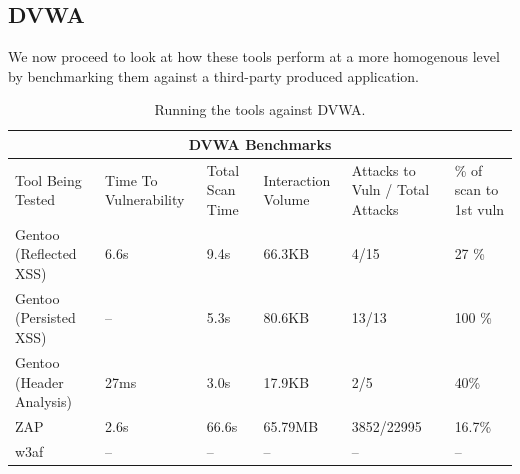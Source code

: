 \subsection{DVWA}

We now proceed to look at how these tools perform at a more homogenous level by benchmarking them against a third-party produced application. \\
\begin{table}[h]
	
	{

		\captionsetup{justification=centering}		
		\caption{Running the tools against DVWA.}
		\label{table:dvwa_benchmarks}
		\begin{tabular}{ |p{4cm}||p{1.4cm}|p{1.4cm}|p{1.6cm}|p{2cm}|p{2cm}| }
			\hline
			\multicolumn{6}{|c|}{\textbf{DVWA Benchmarks}} \\ [0.5ex]
			\hline \hline 
			Tool Being Tested& Time To Vulnerability & Total Scan Time & Interaction Volume & Attacks to Vuln / Total Attacks & \% of scan to 1st vuln \\
			\hline
			Gentoo (Reflected XSS)    & 6.6s      & 9.4s    &   66.3KB          & 4/15 & 27 \% \\
			Gentoo (Persisted XSS)    &  -- & 5.3s & 80.6KB & 13/13 & 100 \% \\
			Gentoo (Header Analysis) & 27ms    &  3.0s    & 17.9KB   &  2/5 & 40\%\\
			ZAP                                  & 2.6s & 66.6s     &  65.79MB & 3852/22995& 16.7\%\\ 
			w3af                                 & -- & -- & -- & -- &-- \\
			\hline
		\end{tabular}
	} \\
\end{table}

